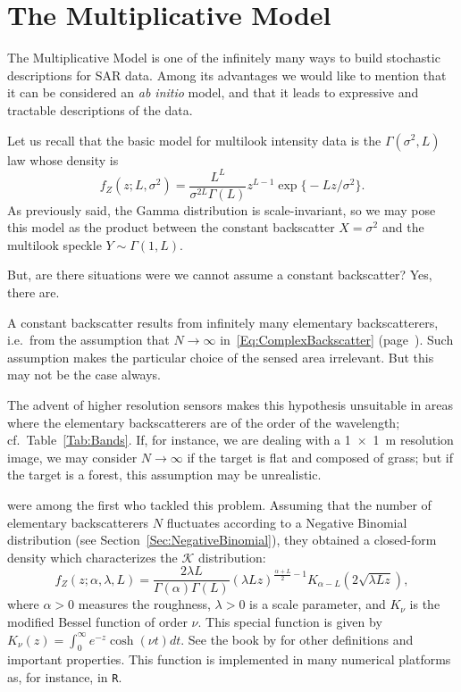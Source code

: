 \chapter{The Multiplicative Model}\label{Chapter:MultiplicativeModel}

The Multiplicative Model is one of the infinitely many ways to build stochastic descriptions for SAR data.
Among its advantages we would like to mention that it can be considered an \textit{ab initio} model, and that it leads to expressive and tractable descriptions of the data.

Let us recall that the basic model for multilook intensity data is the $\Gamma(\sigma^2,L)$ law whose density is
\begin{equation}
f_Z(z;L,\sigma^2) = \frac{L^L}{\sigma^{2L}\Gamma(L)} z^{L-1} 
	\exp\big\{ -L z / \sigma^2
	\big\}.
\end{equation}
As previously said, the Gamma distribution is scale-invariant, so we may pose this model as the product between the constant backscatter $X=\sigma^2$ and the multilook speckle $Y\sim\Gamma(1,L)$.

But, are there situations were we cannot assume a constant backscatter?
Yes, there are.

A constant backscatter results from infinitely many elementary backscatterers, i.e.\ from the assumption that $N\to\infty$ in~\eqref{Eq:ComplexBackscatter} (page~\pageref{Eq:ComplexBackscatter}).
Such assumption makes the particular choice of the sensed area irrelevant.
But this may not be the case always.

The advent of higher resolution sensors makes this hypothesis unsuitable in areas where the elementary backscatterers are of the order of the wavelength; cf.\ Table~\ref{Tab:Bands}.
If, for instance, we are dealing with a \SI{1x1}{\meter} resolution image, we may consider $N\to\infty$ if the target is flat and composed of grass;
but if the target is a forest, this assumption may be unrealistic.

\citet{JakemanPusey76} were among the first who tackled this problem.
Assuming that the number of elementary backscatterers $N$ fluctuates according to a Negative Binomial distribution (see Section~\ref{Sec:NegativeBinomial}), they obtained a closed-form density which characterizes the $\mathcal K$ distribution:
\begin{equation}
f_Z(z;\alpha,\lambda,L) =
\frac{2\lambda L}{\Gamma(\alpha)\Gamma(L)} (\lambda L z)^{\frac{\alpha+L}{2}-1} K_{\alpha-L}(2\sqrt{\lambda L z}),
\label{Eq:DensKI}
\end{equation}
where $\alpha>0$ measures the roughness, $\lambda>0$ is a scale parameter, and $K_\nu$ is the modified Bessel function of order $\nu$.
This special function is given by $K_\nu (z) = \int_0^\infty e^{-z} \cosh (\nu t) dt$.
See the book by \citet{Gradshteyn80} for other definitions and important properties.
This function is implemented in many numerical platforms as, for instance, in \texttt R.

